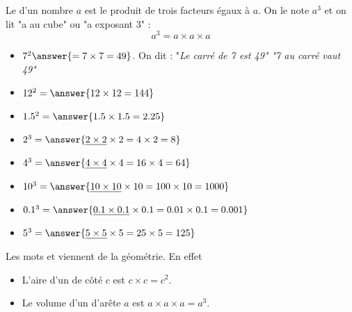 \begin{definitionbox}
    Le  d'un nombre $a$ est le produit de trois facteurs égaux à $a$. 
    On le note $a^3$ et on lit  "a au cube" ou "a exposant 3" :
    $$a^3=a\times a\times a$$
\end{definitionbox}

\begin{exemplebox}
    \begin{itemize}
        \item $7^2\answer{ = 7\times 7 = 49}$. On dit : "\it{Le carré de 7 est 49}"
             "\it{7 au carré vaut 49}"
        \item $12^2=\answer{12 \times 12 = 144}$
        \item $1.5^2=\answer{1.5 \times 1.5 = 2.25}$
    \end{itemize}
\end{exemplebox}

\begin{exercicebox}
    \begin{itemize}
        \item $2^3=\answer{\underline{2 \times 2} \times 2 = 4 \times 2 = 8}$
        \item $4^3=\answer{\underline{4\times 4}\times 4 = 16\times 4 = 64}$
        \item $10^3=\answer{\underline{10\times 10}\times 10 = 100\times 10 = 1000}$
        \item $0.1^3=\answer{\underline{0.1\times 0.1}\times 0.1 = 0.01\times 0.1= 0.001}$
        \item $5^3=\answer{\underline{5\times 5}\times 5 = 25\times 5 = 125}$
    \end{itemize}
\end{exercicebox}

\begin{remarquebox}
    Les mots  et  viennent de la géométrie. En effet
    \begin{itemize}
        \item L'aire d'un  de côté $c$ est $c\times c=c^2$.
        \item Le volume d'un  d'arête $a$ est $a\times a\times a=a^3$.
    \end{itemize}
\end{remarquebox}

